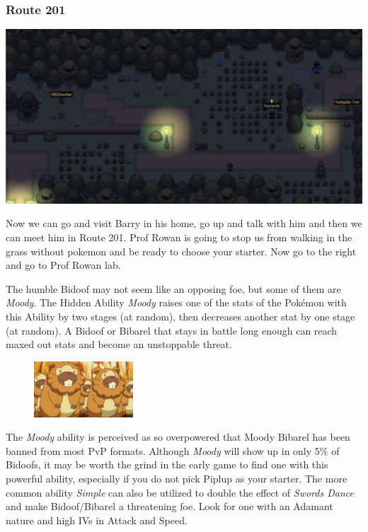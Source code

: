\documentclass[11pt]{article}
\begin{document}
\subsubsection{Route 201}\label{subsubsec:route_201}
\includegraphics[width=\textwidth]{walkthrough/Sinnoh/Route_201}

Now we can go and visit Barry in his home, go up and talk with him
and then we can meet him in Route 201.
Prof  Rowan is going to stop us from walking in the grass without pokemon
and be ready to choose your starter.
Now go to the right and go to Prof Rowan lab.



\begin{mdframed}[style=PokemonSpotlight,nobreak=true,frametitle={Pokemon Spotlight: Bidoof}]
The humble Bidoof may not seem like an opposing foe, but some of them are \emph{Moody}.
The Hidden Ability \emph{Moody} raises one of the stats of the Pokémon with this
Ability by two stages (at random), then decreases another stat by one stage (at random).
A Bidoof or Bibarel that stays in battle long enough can reach maxed out stats
and become an unstoppable threat.

\begin{figure}
\includegraphics[width=0.33\textwidth]{walkthrough/Sinnoh/spotlight-bidoof}
\label{fig:spotlight-bidoof}
\end{figure}

The \emph{Moody} ability is perceived as so overpowered that Moody Bibarel has been
banned from most PvP formats.
Although \emph{Moody} will show up in only 5\% of Bidoofs, it may be worth the
grind in the early game to find one with this powerful ability, especially if
you do not pick Piplup as your starter.
The more common ability \emph{Simple} can also be utilized to double the effect of
\emph{Swords Dance} and make Bidoof/Bibarel a threatening foe.
Look for one with an Adamant nature and high IVs in Attack and Speed.
\end{mdframed}
\end{document}
